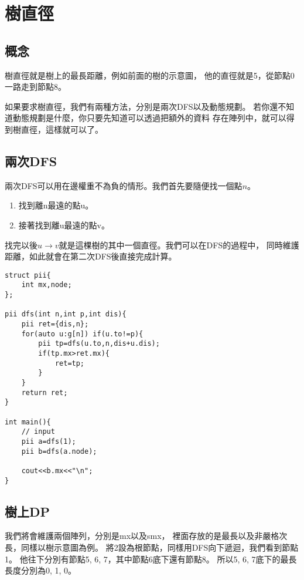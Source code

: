 \section{樹直徑}
    \subsection{概念}
    樹直徑就是樹上的最長距離，例如前面的樹的示意圖，
    他的直徑就是5，從節點0一路走到節點8。

    如果要求樹直徑，我們有兩種方法，分別是兩次DFS以及動態規劃。
    若你還不知道動態規劃是什麼，你只要先知道可以透過把額外的資料
    存在陣列中，就可以得到樹直徑，這樣就可以了。

    \subsection{兩次DFS}
    兩次DFS可以用在邊權重不為負的情形。我們首先要隨便找一個點$n$。

    \begin{enumerate}
        \item 找到離n最遠的點u。
        \item 接著找到離u最遠的點v。
    \end{enumerate}

    找完以後$u \to v$就是這棵樹的其中一個直徑。我們可以在DFS的過程中，
    同時維護距離，如此就會在第二次DFS後直接完成計算。

\begin{lstlisting}[caption=兩次DFS]
struct pii{
    int mx,node;
};

pii dfs(int n,int p,int dis){
    pii ret={dis,n};
    for(auto u:g[n]) if(u.to!=p){
        pii tp=dfs(u.to,n,dis+u.dis);
        if(tp.mx>ret.mx){
            ret=tp;
        }
    }
    return ret;
}

int main(){
    // input
    pii a=dfs(1);
    pii b=dfs(a.node);

    cout<<b.mx<<"\n";
}
\end{lstlisting}

    \subsection{樹上DP}

    我們將會維護兩個陣列，分別是mx以及smx，
    裡面存放的是最長以及非嚴格次長，同樣以樹示意圖為例。
    將2設為根節點，同樣用DFS向下遞迴，我們看到節點1。
    他往下分別有節點5, 6, 7，其中節點6底下還有節點8。
    所以5, 6, 7底下的最長長度分別為0, 1, 0。

